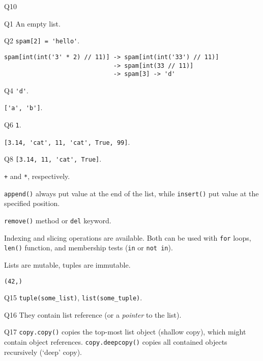 \documentclass[a4paper,11pt]{scrartcl}
\begin{document}
\begin{labeling}{Q10}
  \item[Q1]
  An empty list.

  \item[Q2]
  \lstinline{spam[2] = 'hello'}.

  \item[Q3]
  \begin{lstlisting}
spam[int(int('3' * 2) // 11)] -> spam[int(int('33') // 11)]
                              -> spam[int(33 // 11)]
                              -> spam[3] -> 'd'
  \end{lstlisting}

  \item[Q4]
  \lstinline{'d'}.

  \item[Q5]
  \lstinline{['a', 'b']}.

  \item[Q6]
  \lstinline{1}.

  \item[Q7]
  \lstinline{[3.14, 'cat', 11, 'cat', True, 99]}.

  \item[Q8]
  \lstinline{[3.14, 11, 'cat', True]}.

  \item[Q9]
  \lstinline{+} and \lstinline{*}, respectively.

  \item[Q10]
  \lstinline{append()} always put value at the end of the list, while \lstinline{insert()} put value at the specified position.

  \item[Q11]
  \lstinline{remove()} method or \lstinline{del} keyword.

  \item[Q12]
  Indexing and slicing operations are available. Both can be used with \lstinline{for} loops, \lstinline{len()} function, and membership tests (\lstinline{in} or \lstinline{not in}).

  \item[Q13]
  Lists are mutable, tuples are immutable.

  \item[Q14]
  \lstinline{(42,)}

  \item[Q15]
  \lstinline{tuple(some_list)}, \lstinline{list(some_tuple)}.

  \item[Q16]
  They contain list reference (or a \emph{pointer} to the list).

  \item[Q17]
  \lstinline{copy.copy()} copies the top-most list object (shallow copy), which might contain object references. \lstinline{copy.deepcopy()} copies all contained objects recursively (`deep' copy).

\end{labeling}
\end{document}
